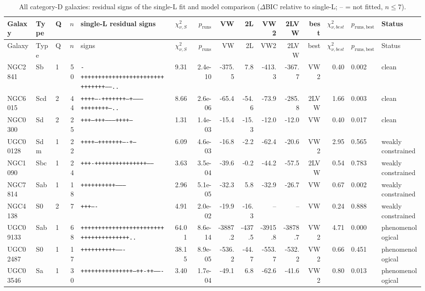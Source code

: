 \documentclass[10pt]{article}
\begin{document}
\clearpage\begin{landscape}{\scriptsize\setlength{\tabcolsep}{3pt}
\begin{longtable}{lllrlrrrrrrrrll}
\caption{All category-D galaxies: residual signs of the single-L fit and model comparison ($\Delta$BIC relative to single-L; -- = not fitted, $n\le7$).}\\\toprule
Galaxy & Type & Q & $n$ & single-L residual signs & $\chi^2_{\nu,S}$ & $p_\mathrm{runs}$ & VW & 2L & VW2 & 2LVW & best & $\chi^2_{\nu,best}$ & $p_\mathrm{runs,best}$ & Status\\\midrule\endfirsthead
\toprule Galaxy & Type & Q & $n$ & signs & $\chi^2_{\nu,S}$ & $p_\mathrm{runs}$ & VW & 2L & VW2 & 2LVW & best & $\chi^2_{\nu,best}$ & $p_\mathrm{runs,best}$ & Status\\\midrule\endhead\bottomrule\endfoot
NGC2841 & Sb & 1 & 50 & \texttt{-+++++++++++++++++++++++++++++++------..} & 9.31 & 2.4e-10 & -375.5 & 7.8 & -413.3 & -367.7 & VW2 & 0.40 & 0.002 & clean\\
NGC6015 & Scd & 2 & 44 & \texttt{++++----+++++++--+---------++++++++---..} & 8.66 & 2.6e-06 & -65.4 & -54.6 & -73.9 & -285.8 & 2LVW & 1.66 & 0.003 & clean\\
NGC0300 & Sd & 2 & 25 & \texttt{+++---+++---------++++---} & 1.31 & 1.4e-03 & -15.4 & -15.3 & -12.0 & -12.0 & VW & 0.40 & 0.017 & clean\\
UGC00128 & Sdm & 1 & 22 & \texttt{++++---+++++++----+---} & 6.09 & 4.6e-03 & -16.8 & -2.2 & -62.4 & -20.6 & VW2 & 2.95 & 0.565 & weakly constrained\\
NGC1090 & Sbc & 1 & 24 & \texttt{+++-+++++++++++++++-----} & 3.63 & 3.5e-04 & -39.6 & -0.2 & -44.2 & -57.5 & 2LVW & 0.54 & 0.783 & weakly constrained\\
NGC7814 & Sab & 1 & 18 & \texttt{++++++++++--------} & 2.96 & 5.1e-05 & -32.3 & 5.8 & -32.9 & -26.7 & VW & 0.67 & 0.002 & weakly constrained\\
NGC4138 & S0 & 2 & 7 & \texttt{+++----} & 4.91 & 2.0e-02 & -19.9 & -16.3 & -- & -- & VW & 0.24 & 0.888 & weakly constrained\\
UGC09133 & Sab & 1 & 68 & \texttt{++++++++++++++++++++++++++++++++++++++..} & 64.01 & 8.6e-14 & -3887.2 & -437.5 & -3915.8 & -3878.7 & VW2 & 4.71 & 0.000 & phenomenological\\
UGC02487 & S0 & 1 & 17 & \texttt{++++++++++-------} & 38.15 & 8.9e-05 & -536.2 & -44.7 & -553.7 & -532.2 & VW2 & 0.66 & 0.451 & phenomenological\\
UGC03546 & Sa & 1 & 30 & \texttt{+++++++++++++++---++-++-------} & 3.40 & 1.7e-04 & -49.1 & 6.8 & -62.6 & -41.6 & VW2 & 0.80 & 0.013 & phenomenological\\

\end{longtable}}
\end{landscape}
\end{document}
